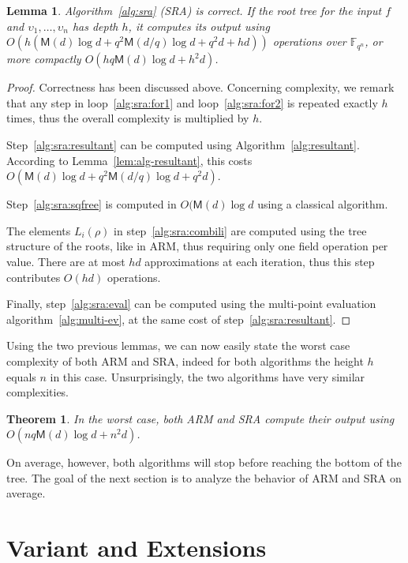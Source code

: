 \documentclass{sig-alternate}
\newcommand{\ff}[1]{\mathbb{F}_{#1}}
\newcommand{\dd}{d}
\newcommand{\qq}{q}
\newcommand{\nn}{n}
\newcommand{\qn}{{\qq^\nn}}
\newcommand{\extf}{\ff{\qn}}
\newcommand{\Mul}{\mathsf{M}}
\newcounter{algo}
\newtheorem{Theo}{Theorem}
\newtheorem{Lem}{Lemma}
\begin{document}
 \begin{Lem}
 \label{complexity_sra}
   Algorithm~\ref{alg:sra} (SRA) is correct. If the root tree for the
   input $f$ and $\upsilon_1,\dots,\upsilon_\nn$ has depth $h$, it computes its
   output using $O\left(h(\Mul(\dd)\log \dd +
     \qq^2\Mul(\dd/\qq)\log\dd + \qq^2\dd + h\dd)\right)$ operations
   over $\extf$, or more compactly $O(h\qq\Mul(\dd)\log\dd + h^2\dd)$.
 \end{Lem}
 \begin{proof}
   Correctness has been discussed above. Concerning complexity, we
   remark that any step in loop~\ref{alg:sra:for1} and
   loop~\ref{alg:sra:for2} is repeated exactly $h$ times, thus the
   overall complexity is multiplied by $h$.

   Step~\ref{alg:sra:resultant} can be computed using
   Algorithm~\ref{alg:resultant}. According to
   Lemma~\ref{lem:alg-resultant}, this costs $O(\Mul(\dd) \log\dd +
   \qq^2\Mul(\dd/\qq)\log\dd + \qq^2\dd)$.

   Step~\ref{alg:sra:sqfree} is computed in $O(\Mul(\dd)\log\dd$ using
   a classical algorithm.

   The elements $L_i(\rho)$ in step~\ref{alg:sra:combili} are computed
   using the tree structure of the roots, like in ARM, thus requiring
   only one field operation per value. There are at most $hd$
   approximations at each iteration, thus this step contributes
   $O(hd)$ operations.
   
   Finally, step~\ref{alg:sra:eval} can be computed using the
   multi-point evaluation algorithm~\ref{alg:multi-ev}, at the same
   cost of step~\ref{alg:sra:resultant}.
 \end{proof}

 Using the two previous lemmas, we can now easily state the worst case
 complexity of both ARM and SRA, indeed for both algorithms the height
 $h$ equals $\nn$ in this case. Unsurprisingly, the two algorithms
 have very similar complexities.

 \begin{Theo}
   In the worst case, both ARM and SRA compute their output using
   $O(nq\Mul(d)\log d + n^2d)$.
 \end{Theo}
 
 On average, however, both algorithms will stop before reaching the
 bottom of the tree. The goal of the next section is to analyze the
 behavior of ARM and SRA on average.




\section{Variant and Extensions}
\end{document}
